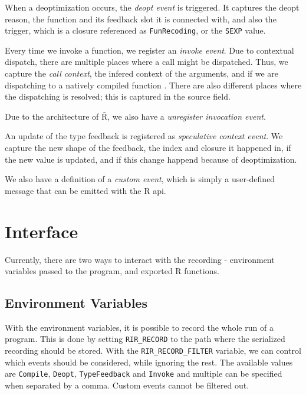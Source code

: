When a deoptimization occurs, the \textit{deopt event} is triggered. It captures the deopt reason, the function and its feedback slot it is connected with, and also the trigger, which is a closure referenced as \texttt{FunRecoding}, or the \texttt{SEXP} value.

Every time we invoke a function, we register an \textit{invoke event}. Due to contextual dispatch, there are multiple places where a call might be dispatched. Thus, we capture the \textit{call context}, the infered context of the arguments, and if we are dispatching to a natively compiled function . There are also different places where the dispatching is resolved; this is captured in the source field.

Due to the architecture of Ř, we also have a \textit{unregister invocation event}. \todoadd

An update of the type feedback is registered as \textit{speculative context event}. We capture the new shape of the feedback, the index and closure it happened in, if the new value is updated, and if this change happend because of deoptimization.

We also have a definition of a \textit{custom event}, which is simply a user-defined message that can be emitted with the R api.

\section{Interface}

Currently, there are two ways to interact with the recording - environment variables passed to the program, and exported R functions.

\subsection*{Environment Variables}

With the environment variables, it is possible to record the whole run of a program. This is done by setting \texttt{RIR\_RECORD} to the path where the serialized recording should be stored. With the \texttt{RIR\_RECORD\_FILTER} variable, we can control which events should be considered, while ignoring the rest. The available values are \texttt{Compile}, \texttt{Deopt}, \texttt{TypeFeedback} and \texttt{Invoke} and multiple can be specified when separated by a comma. Custom events cannot be filtered out.

